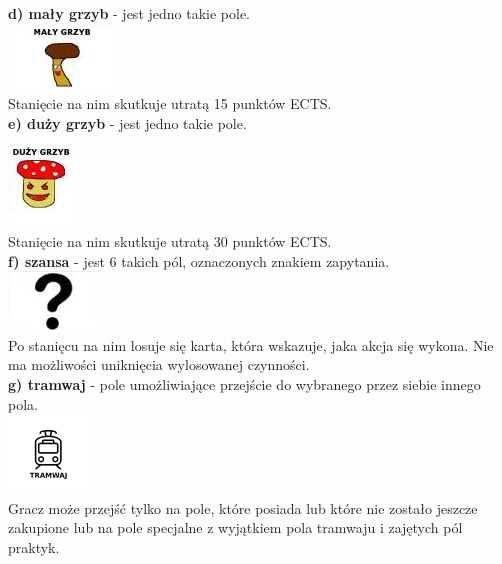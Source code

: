 \documentclass[a4paper]{article}
\begin{document}
\noindent \textbf{d) mały grzyb} - jest jedno takie pole.\\
\indent \includegraphics[scale=0.5]{s_mush.png}\\
\noindent Stanięcie na nim skutkuje utratą 15 punktów ECTS.\\

\noindent \textbf{e) duży grzyb} - jest jedno takie pole.\\
\indent \includegraphics[scale=0.5]{l_mush.png}\\
\noindent Stanięcie na nim skutkuje utratą 30 punktów ECTS.\\

\noindent \textbf{f) szansa} - jest 6 takich pól, oznaczonych znakiem zapytania.\\
\indent \includegraphics[scale=0.7]{chance.png}\\
\noindent Po stanięcu na nim losuje się karta, która wskazuje, jaka akcja się wykona. Nie ma możliwości uniknięcia wylosowanej czynności.\\

\noindent \textbf{g) tramwaj} - pole umożliwiające przejście do wybranego przez siebie innego pola.\\
\indent\includegraphics[scale=0.8]{tram.png}\\
\noindent Gracz może przejść tylko na pole, które posiada lub które nie zostało jeszcze zakupione lub na pole specjalne z wyjątkiem pola tramwaju i zajętych pól praktyk. \\
\end{document}
